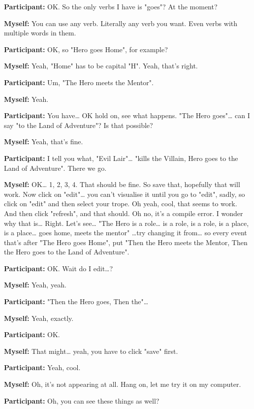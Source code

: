 \documentclass[11pt]{report}
\begin{document}
\begin{linenumbers}
\textbf{Participant:} OK. So the only verbs I have is "goes"? At the moment?

\textbf{Myself:} You can use any verb. Literally any verb you want. Even verbs with multiple words in them.

\textbf{Participant:} OK, so "Hero goes Home", for example?

\textbf{Myself:} Yeah, "Home" has to be capital "H". Yeah, that's right.

\textbf{Participant:} Um, "The Hero meets the Mentor".

\textbf{Myself:} Yeah.

\textbf{Participant:} You have\ldots{} OK hold on, see what happens. "The Hero goes"\ldots{} can I say "to the Land of Adventure"? Is that possible?

\textbf{Myself:} Yeah, that's fine.

\textbf{Participant:} I tell you what, "Evil Lair"\ldots{} "kills the Villain, Hero goes to the Land of Adventure". There we go.

\textbf{Myself:} OK\ldots{} 1, 2, 3, 4. That should be fine. So save that, hopefully that will work. Now click on "edit"\ldots{} you can't visualise it until you go to "edit", sadly, so click on "edit" and then select your trope. Oh yeah, cool, that seems to work. And then click "refresh", and that should. Oh no, it's a compile error. I wonder why that is\ldots{} Right. Let's see\ldots{} "The Hero is a role\ldots{} is a role, is a role, is a place, is a place\ldots{} goes home, meets the mentor" \ldots{}try changing it from\ldots{} so every event that's after "The Hero goes Home", put "Then the Hero meets the Mentor, Then the Hero goes to the Land of Adventure".

\textbf{Participant:} OK. Wait do I edit\ldots{}?

\textbf{Myself:} Yeah, yeah.

\textbf{Participant:} "Then the Hero goes, Then the"\ldots{}

\textbf{Myself:} Yeah, exactly.

\textbf{Participant:} OK.

\textbf{Myself:} That might\ldots{} yeah, you have to click "save" first.

\textbf{Participant:} Yeah, cool.

\textbf{Myself:} Oh, it's not appearing at all. Hang on, let me try it on my computer.

\textbf{Participant:} Oh, you can see these things as well?


\end{linenumbers}
\end{document}
